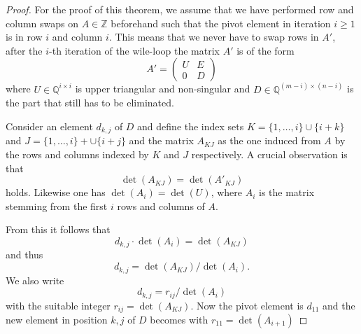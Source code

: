 \begin{proof}
For the proof of this theorem, we assume that we have performed row and column swaps on $A∈ ℤ$ beforehand such that the pivot element in iteration $i≥1$    is in row $i$ and column $i$. This means that we never have to swap rows in $A'$, after the $i$-th iteration of the wile-loop the matrix $A'$ is of the form 
\begin{displaymath}
  A' =
  \begin{pmatrix}
    U &  E \\
    0 & D 
  \end{pmatrix}
\end{displaymath}
where $U ∈ ℚ^{i ×i}$ is upper triangular and non-singular and $D ∈ ℚ^{(m-i) × (n-i)}$ is the part that still has to be eliminated. 



  Consider an element $d_{k,j}$ of $D$ and  define the index sets
  $K = \{1,\dots,i\} ∪\{i+ k\}$ and $J = \{1,\dots,i\} + ∪ \{i+ j\}$ and the matrix
  $A_{KJ}$ as the one induced from $A$ by the rows and columns indexed
  by $K$ and $J$ respectively. A crucial observation is that
  \begin{displaymath}
   \det(A_{KJ}) = \det(A'_{KJ}) 
 \end{displaymath}
 holds. Likewise one has $\det(A_i) = \det(U)$, where $A_i$ is the
 matrix stemming from the first $i$ rows and columns of $A$.


 From this it follows that
 \begin{displaymath}
  d_{k,j} ⋅ \det(A_i)  =   \det(A_{KJ}) 
 \end{displaymath}
 and thus
 \begin{displaymath}
   d_{k,j}  =   \det(A_{KJ})   / \det(A_i). 
 \end{displaymath}
 We also write
 \begin{displaymath}
   d_{k,j}  =   r_{ij}   / \det(A_i)
 \end{displaymath}
 with the suitable integer $r_{ij} = \det(A_{KJ})$. 
 Now the  pivot element is $d_{11}$ and the new element in position $k,j$ of $D$ becomes with $r_{11} = \det(A_{i+1})$ 


\end{proof}
